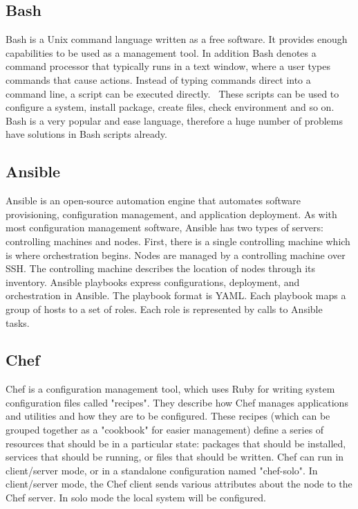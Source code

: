 \subsection*{Bash} \label{lang:bash}
Bash is a Unix command language written as a free software.
It provides enough capabilities to be used as a  management tool.
In addition Bash denotes a command processor that typically runs in a text window, where a user types commands that cause actions.
Instead of typing commands direct into a command line, a script can be executed directly.~\cite{bash}
These scripts can be used to configure a system, install package, create files, check environment and so on.
Bash is a very popular and ease language, therefore a huge number of problems have solutions in Bash scripts already.

\subsection*{Ansible} \label{lang:ansible}
Ansible is an open-source automation engine that automates software provisioning, configuration management, and application deployment.
As with most configuration management software, Ansible has two types of servers: controlling machines and nodes.
First, there is a single controlling machine which is where orchestration begins.
Nodes are managed by a controlling machine over SSH.
The controlling machine describes the location of nodes through its inventory.
Ansible playbooks express configurations, deployment, and orchestration in Ansible.
The playbook format is YAML. 
Each playbook maps a group of hosts to a set of roles.
Each role is represented by calls to Ansible tasks.~\cite{ansible} 

\subsection*{Chef} \label{lang:shef}
Chef is a configuration management tool, which uses Ruby for writing system configuration files called "recipes".
They describe how Chef manages applications and utilities and how they are to be configured.
These recipes (which can be grouped together as a "cookbook" for easier management) define a series of resources that should be in a particular state: packages that should be installed, services that should be running, or files that should be written.
Chef can run in client/server mode, or in a standalone configuration named "chef-solo".
In client/server mode, the Chef client sends various attributes about the node to the Chef server. 
In solo mode the local system will be configured.~\cite{chef}

